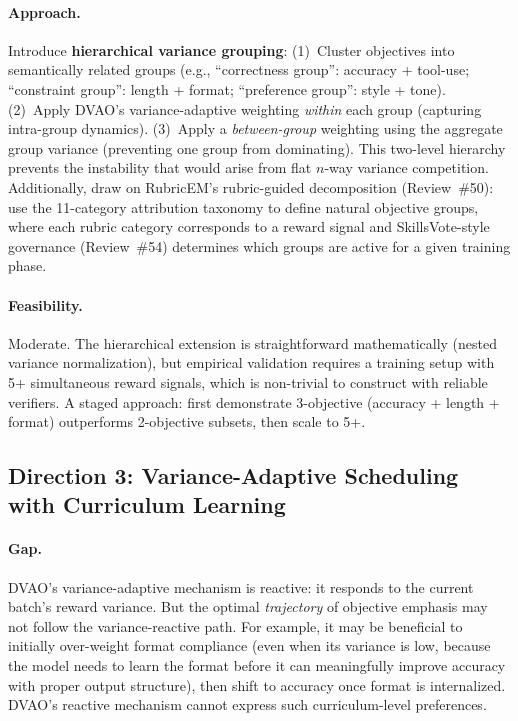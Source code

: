 \documentclass[11pt,a4paper]{article}
\begin{document}
\paragraph{Approach.}
Introduce \textbf{hierarchical variance grouping}: (1)~Cluster objectives into semantically related groups (e.g., ``correctness group'': accuracy + tool-use; ``constraint group'': length + format; ``preference group'': style + tone). (2)~Apply DVAO's variance-adaptive weighting \emph{within} each group (capturing intra-group dynamics). (3)~Apply a \emph{between-group} weighting using the aggregate group variance (preventing one group from dominating). This two-level hierarchy prevents the instability that would arise from flat $n$-way variance competition. Additionally, draw on RubricEM's rubric-guided decomposition (Review~\#50): use the 11-category attribution taxonomy to define natural objective groups, where each rubric category corresponds to a reward signal and SkillsVote-style governance (Review~\#54) determines which groups are active for a given training phase.

\paragraph{Feasibility.}
Moderate. The hierarchical extension is straightforward mathematically (nested variance normalization), but empirical validation requires a training setup with 5+ simultaneous reward signals, which is non-trivial to construct with reliable verifiers. A staged approach: first demonstrate 3-objective (accuracy + length + format) outperforms 2-objective subsets, then scale to 5+.

\subsection*{Direction 3: Variance-Adaptive Scheduling with Curriculum Learning}

\paragraph{Gap.}
DVAO's variance-adaptive mechanism is reactive: it responds to the current batch's reward variance. But the optimal \emph{trajectory} of objective emphasis may not follow the variance-reactive path. For example, it may be beneficial to initially over-weight format compliance (even when its variance is low, because the model needs to learn the format before it can meaningfully improve accuracy with proper output structure), then shift to accuracy once format is internalized. DVAO's reactive mechanism cannot express such curriculum-level preferences.
\end{document}
